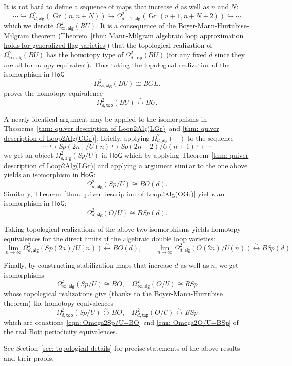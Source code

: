 \documentclass{amsart}
\theoremstyle{definition}
\newcommand{\HoG}{\textsf{HoG}}
\newcommand{\alg}{\mathsf{alg}}
\renewcommand{\top}{\mathsf{top}}
\newcommand{\Gr}{\operatorname{Gr}}
\newcommand{\LoopTwo}{\Omega^{2}_{d,\alg}}
\newcommand{\LoopTwoTop}{\Omega^{2}_{d,\top}}
\newcommand{\homotopyeq}{\overset \sim \longleftrightarrow}
\begin{document}
It is not hard to define a sequence of maps that increase $d$ as well as $n$ and
$N$:
\[
\dotsb \hookrightarrow \LoopTwo (\Gr (n,n+N))\hookrightarrow
\Omega^{2}_{d+1,\alg} (\Gr (n+1,n+N+2))\hookrightarrow \dotsb
\]
which we denote $\Omega^{2}_{\infty ,\alg}(BU)$. It is a consequence
of the Boyer-Mann-Hurtubise-Milgram theorem (Theorem~\ref{thm:
Mann-Milgram algebraic loop approximation holds for generalized flag
varieties}) that the topological realization of $\Omega^{2}_{\infty
,\alg}(BU)$ has the homotopy type of $\LoopTwoTop (BU)$ (for any fixed
$d$ since they are all homotopy equivalent). Thus taking the
topological realization of the isomorphism
in $\HoG$ 
\[
\Omega^{2}_{\infty ,\alg } (BU)\cong BGL. 
\]
proves the homotopy equivalence
\[
\LoopTwoTop (BU)\homotopyeq BU .
\]

A nearly identical argument may be applied to the isomorphisms in
Theorems~\ref{thm: quiver description of Loop2Alg(LGr)} and \ref{thm:
quiver description of Loop2Alg(OGr)}. Briefly, applying $\LoopTwo (-)$
to the sequence
\[
\dotsb \hookrightarrow Sp(2n)/U(n) \hookrightarrow Sp(2n+2)/U(n+1) \hookrightarrow \dotsb 
\]
we get an object $\LoopTwo (Sp/U)$ in $\HoG$ which by applying
Theorem~\ref{thm: quiver description of Loop2Alg(LGr)} and applying a
argument similar to the one above yields an isomorphism in $\HoG$:
\[
\LoopTwo (Sp/U) \cong BO(d) . 
\]
Similarly, Theorem~\ref{thm: quiver description of Loop2Alg(OGr)}
yields an isomorphism in $\HoG $:
\[
\LoopTwo (O/U) \cong BSp(d) . 
\]

Taking topological realizations of the above two isomorphisms yields
homotopy equivalences for the direct limits of the algebraic double
loop varieties:
\[
\lim_{n\to \infty} \LoopTwo (Sp(2n)/U(n)) \homotopyeq BO(d),\quad
\quad \lim_{n\to \infty} \LoopTwo (O(2n)/U(n)) \homotopyeq BSp(d)
\]



Finally, by constructing stabilization maps that increase $d$ as well
as $n$, we get isomorphisms
\[
\Omega^{2}_{\infty ,\alg } (Sp/U) \cong BO, \quad \Omega^{2}_{\infty ,\alg } (O/U) \cong BSp 
\]
whose topological realizations give (thanks to the
Boyer-Mann-Hurtubise theorem) the homotopy equivalences
\[
\LoopTwoTop (Sp/U)\homotopyeq BO, \quad \LoopTwoTop (O/U)\homotopyeq
BSp
\]
which are equations~\eqref{eqn: Omega2Sp/U=BO} and \eqref{eqn:
Omega2O/U=BSp} of the real Bott periodicity equivalences.

See Section~\ref{sec: topological details} for precise statements of
the above results and their proofs.
\end{document}
